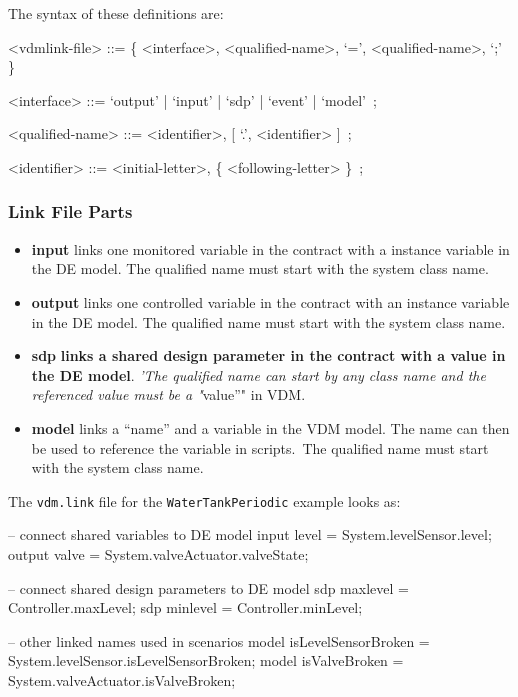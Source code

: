 \documentclass{crescendorepchap}
\newcommand{\vdmkeyw}[1]{{\bf\ttfamily #1}}
\begin{document}
The syntax of these definitions are:

\begin{grammar}
<vdmlink-file> ::= \{ <interface>, <qualified-name>, `=', <qualified-name>, `;' \}

<interface> ::= `output' | `input'  | `sdp' | `event'  | `model'~;

<qualified-name> ::= <identifier>, {[} `.', <identifier> {]}~;

<identifier> ::= <initial-letter>, \{ <following-letter> \}~;
\end{grammar}

\subsubsection{Link File Parts}

\begin{itemize}
\item
  \vdmkeyw{input} links one monitored variable in the contract with a
  instance variable in the DE model. The qualified name must start with
  the system class name.
\item
  \vdmkeyw{output} links one controlled variable in the contract with
  an instance variable in the DE model. The qualified name must start
  with the system class name.
\item
  \vdmkeyw{sdp} \textbf{links a shared design parameter in the contract with
  a value in the DE model}. \emph{'The qualified name can start by any
  class name and the referenced value must be a "}value''" in VDM.
\item
  \vdmkeyw{model} links a ``name'' and a variable in the VDM model. The
  name can then be used to reference the variable in scripts.~The
  qualified name must start with the system class name.
\end{itemize}

The \texttt{vdm.link} file for the \texttt{WaterTankPeriodic} example looks as:

\begin{dcl}
-- connect shared variables to DE model
input level = System.levelSensor.level; 
output valve = System.valveActuator.valveState;

-- connect shared design parameters to DE model
sdp maxlevel = Controller.maxLevel;
sdp minlevel = Controller.minLevel;
	
-- other linked names used in scenarios
model isLevelSensorBroken = System.levelSensor.isLevelSensorBroken;
model isValveBroken = System.valveActuator.isValveBroken;
\end{dcl}
\end{document}
